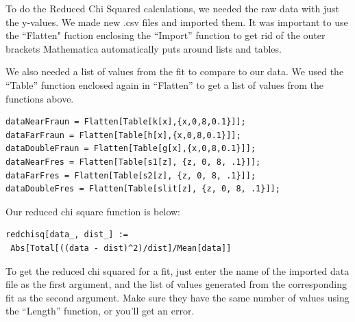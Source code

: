 \documentclass[prb,preprint]{revtex4-1}
\begin{document}
To do the Reduced Chi Squared calculations, we needed the raw data with just the y-values. We made new .csv files and imported them.  It was important to use the ``Flatten" fuction enclosing the ``Import'' function to get rid of the outer brackets Mathematica automatically puts around lists and tables.  

We also needed a list of values from the fit to compare to our data. We used the ``Table'' function enclosed again in ``Flatten'' to get a list of values from the functions above. 
\begin{verbatim}
dataNearFraun = Flatten[Table[k[x],{x,0,8,0.1}]];
dataFarFraun = Flatten[Table[h[x],{x,0,8,0.1}]];
dataDoubleFraun = Flatten[Table[g[x],{x,0,8,0.1}]];
dataNearFres = Flatten[Table[s1[z], {z, 0, 8, .1}]];
dataFarFres = Flatten[Table[s2[z], {z, 0, 8, .1}]];
dataDoubleFres = Flatten[Table[slit[z], {z, 0, 8, .1}]];
\end{verbatim}

Our reduced chi square function is below:
\begin{verbatim}
redchisq[data_, dist_] := 
 Abs[Total[((data - dist)^2)/dist]/Mean[data]]
\end{verbatim}

To get the reduced chi squared for a fit, just enter the name of the imported data file as the first argument, and the list of values generated from the corresponding fit as the second argument. Make sure they have the same number of values using the ``Length'' function, or you'll get an error. 
\end{document}
